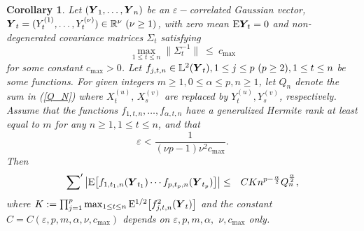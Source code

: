 \documentclass[10pt]{article}
\def\L{\mathbb{L}}
\def\R{\mathbb{R}}
\def\E{\mathrm E}
\newcommand{\mbf}[1]{\mbox{\boldmath $#1$}}
\newtheorem{cor}{Corollary}
\begin{document}
\begin{cor}\label{corgauss}
Let $({\mbf Y}_1, \dots, {\mbf Y}_n)$ be an $\varepsilon-$correlated
Gaussian vector, ${\mbf Y}_t = (Y^{(1)}_{t}, \dots, Y^{(\nu)}_{t})
\in {\R}^\nu \ (\nu \ge 1)$, with zero mean $\E {\mbf Y}_{\!t} = 0 $ and non-degenerated covariance matrices
$\Sigma_t $ satisfying
\begin{equation}\label{cmax}
\max_{1 \le t \le n} %
\| \Sigma^{-1}_t \|  \ \le \ c_{\max}
\end{equation}
for some constant $c_{\max} >0$.
Let $f_{j,t,n} \in \L^2({\mbf Y}_t),
1\le j \le p \  (p\ge 2), 1\le t \le n $ be some functions. For
given integers $m\ge 1,
0\le \alpha \le p, n \ge 1$,
let $Q_n$ denote the sum in (\ref{Q_N}) where $ X^{(u)}_{t}, \, X^{(v)}_{s} $ are replaced
by $Y^{(u)}_{t}, Y^{(v)}_{s}$, respectively.
Assume that the functions $f_{1,t,n},\dots, f_{\alpha,t,n} $ have
a generalized Hermite rank at least equal to $m$ for any $n\ge 1, 1\le t \le
n$, and that
\begin{equation}
\varepsilon   < \frac{1}{(\nu p-1)\nu^2 c_{\max} }. \label{eps1}
\end{equation}
Then
\begin{eqnarray*}
\sum\nolimits^\prime \big| \E \big[ f_{1,t_1,n}({\mbf Y}_{t_1}) \cdots
f_{p,t_p,n}({\mbf Y}_{t_p})\big] \big| &\le& C K n^{p- \frac{\alpha}{2}} Q_n^{\frac{\alpha}{2} },
\end{eqnarray*}
where $K := \prod_{j=1}^p \max_{1\le t \le n} \E^{1/2} \big[ f_{j,t,n}^2({\mbf Y}_t)\big] $ and the constant $ C = C( \varepsilon, p, m, \alpha, \nu, c_{\max} ) $ depends
on $\varepsilon, p, m, \alpha, $  $\nu, c_{\max} $ only.




\end{cor}
\end{document}
